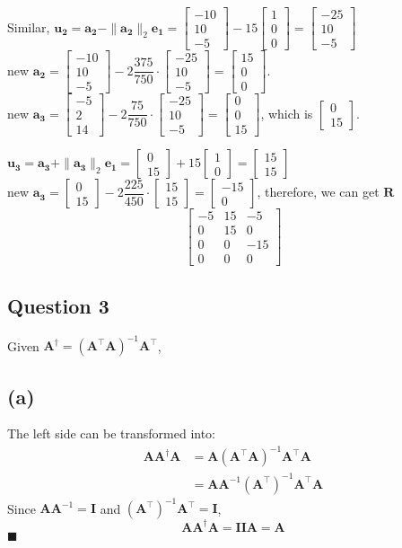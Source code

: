 \documentclass{article}
\newcommand{\bmat}[1]{\begin{bmatrix} #1 \end{bmatrix}}
\newcommand{\mat}[1]{\mathbf{#1}}
\begin{document}
Similar, $\mat{u_2} = \mat{a_2} - \|\mat{a_2}\|_2\mat{e_1} = \bmat{-10\\10\\-5} - 15\bmat{1\\0\\0} = \bmat{-25\\10\\-5}$\\
new $\mat{a_2} = \bmat{-10\\10\\-5} - 2\dfrac{375}{750}\cdot \bmat{-25\\10\\-5} = \bmat{15\\0\\0}$.\\
new $\mat{a_3} = \bmat{-5\\2\\14} - 2\dfrac{75}{750}\cdot \bmat{-25\\10\\-5} = \bmat{0\\0\\15}$, which is $\bmat{0\\15}$.

$\mat{u_3} = \mat{a_3} + \|\mat{a_3}\|_2\mat{e_1} =\bmat{0\\15} + 15\bmat{1\\0} = \bmat{15\\15}$\\
new $\mat{a_3} = \bmat{0\\15} - 2\dfrac{225}{450}\cdot \bmat{15\\15} = \bmat{-15\\0}$, therefore, we can get $\mat{R}$
$$\begin{bmatrix}
    -5 & 15 & -5 \\
    0 & 15 & 0 \\
    0 & 0 & -15\\
    0 & 0 & 0
\end{bmatrix}$$


\subsection*{Question 3}
Given $\mat{A}^\dagger = (\mat{A}^\top \mat{A})^{-1}\mat{A}^\top$,

\subsection*{(a)}
The left side can be transformed into:
\begin{align}
    \mat{A}\mat{A}^\dagger\mat{A} &= \mat{A}  (\mat{A}^\top \mat{A})^{-1}\mat{A}^\top \mat{A}\nonumber \\
    &= \mat{A}\mat{A}^{-1}(\mat{A}^\top)^{-1}\mat{A}^\top \mat{A} \nonumber
\end{align}
Since $\mat{A}\mat{A}^{-1} = \mat{I}$ and $(\mat{A}^\top)^{-1}\mat{A}^\top = \mat{I}$,
$$\mat{A}\mat{A}^\dagger\mat{A} = \mat{I}\mat{I}\mat{A} = \mat{A}$$
$\blacksquare$
\end{document}
